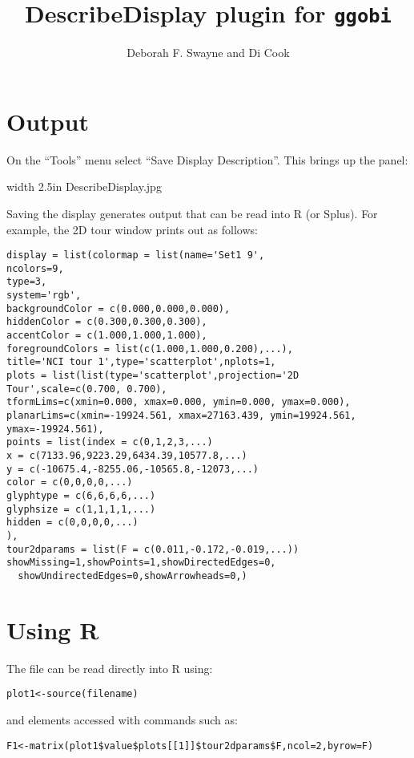 \documentclass[11pt]{article}
\begin{document}
\title{DescribeDisplay plugin for {\tt ggobi}}
\author{Deborah F. Swayne and Di Cook}
\maketitle

\section{Output}

On the ``Tools'' menu select ``Save Display Description''. This brings
up the panel:

\bigskip
\centerline{\pdfimage width 2.5in {DescribeDisplay.jpg}}
\bigskip

Saving the display generates output that can be read into R (or
Splus). For example, the 2D tour window prints out as follows:

\begin{verbatim}
display = list(colormap = list(name='Set1 9',
ncolors=9,
type=3,
system='rgb',
backgroundColor = c(0.000,0.000,0.000),
hiddenColor = c(0.300,0.300,0.300),
accentColor = c(1.000,1.000,1.000),
foregroundColors = list(c(1.000,1.000,0.200),...),
title='NCI tour 1',type='scatterplot',nplots=1,
plots = list(list(type='scatterplot',projection='2D Tour',scale=c(0.700, 0.700),
tformLims=c(xmin=0.000, xmax=0.000, ymin=0.000, ymax=0.000),
planarLims=c(xmin=-19924.561, xmax=27163.439, ymin=19924.561, ymax=-19924.561),
points = list(index = c(0,1,2,3,...)
x = c(7133.96,9223.29,6434.39,10577.8,...)
y = c(-10675.4,-8255.06,-10565.8,-12073,...)
color = c(0,0,0,0,...)
glyphtype = c(6,6,6,6,...)
glyphsize = c(1,1,1,1,...)
hidden = c(0,0,0,0,...)
),
tour2dparams = list(F = c(0.011,-0.172,-0.019,...))
showMissing=1,showPoints=1,showDirectedEdges=0,
  showUndirectedEdges=0,showArrowheads=0,)
\end{verbatim}

\section{Using R}

The file can be read directly into R using: 

\verb#plot1<-source(filename)#

\noindent and elements accessed with commands such as:

\verb#F1<-matrix(plot1$value$plots[[1]]$tour2dparams$F,ncol=2,byrow=F)#
\end{document}
